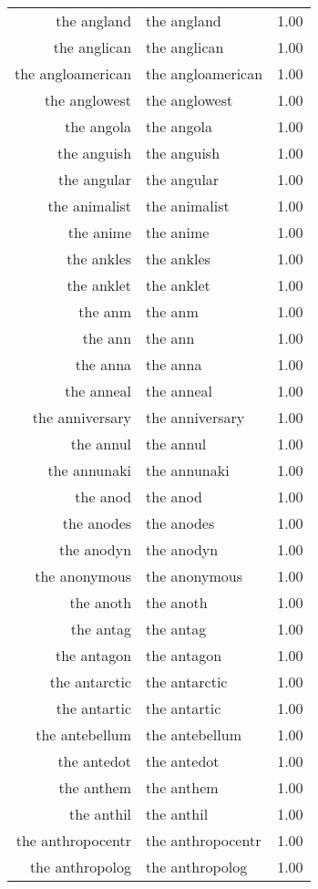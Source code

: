 \begin{table}[ht]
\begin{tabular}{rlr}
  the angland & the angland & 1.00 \\ 
  the anglican & the anglican & 1.00 \\ 
  the angloamerican & the angloamerican & 1.00 \\ 
  the anglowest & the anglowest & 1.00 \\ 
  the angola & the angola & 1.00 \\ 
  the anguish & the anguish & 1.00 \\ 
  the angular & the angular & 1.00 \\ 
  the animalist & the animalist & 1.00 \\ 
  the anime & the anime & 1.00 \\ 
  the ankles & the ankles & 1.00 \\ 
  the anklet & the anklet & 1.00 \\ 
  the anm & the anm & 1.00 \\ 
  the ann & the ann & 1.00 \\ 
  the anna & the anna & 1.00 \\ 
  the anneal & the anneal & 1.00 \\ 
  the anniversary & the anniversary & 1.00 \\ 
  the annul & the annul & 1.00 \\ 
  the annunaki & the annunaki & 1.00 \\ 
  the anod & the anod & 1.00 \\ 
  the anodes & the anodes & 1.00 \\ 
  the anodyn & the anodyn & 1.00 \\ 
  the anonymous & the anonymous & 1.00 \\ 
  the anoth & the anoth & 1.00 \\ 
  the antag & the antag & 1.00 \\ 
  the antagon & the antagon & 1.00 \\ 
  the antarctic & the antarctic & 1.00 \\ 
  the antartic & the antartic & 1.00 \\ 
  the antebellum & the antebellum & 1.00 \\ 
  the antedot & the antedot & 1.00 \\ 
  the anthem & the anthem & 1.00 \\ 
  the anthil & the anthil & 1.00 \\ 
  the anthropocentr & the anthropocentr & 1.00 \\ 
  the anthropolog & the anthropolog & 1.00 \\ 

\end{tabular}
\end{table}
